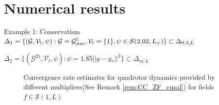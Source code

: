 \documentclass{beamer}
\begin{document}
\section{Numerical results}
\begin{frame}{Example 1: Conservatism}
$\Delta_1 = \{(\mathcal{G},\mathcal{V}_l,\psi):\mathcal{G}=\mathcal{G}_{\textnormal{star}}^5,\mathcal{V}_l=\{1\} , \psi \in \mathcal{S}(2.02,L_{\psi})\} \subset \Delta_{0.3,L}$

$\Delta_2 = \{(\mathcal{G}^{25},\mathcal{V}_l,\psi):\psi = 1.85 ||y-y_*||^2 \} \subset \Delta_{m,L}$
\begin{figure}[t]
	
	\caption{Convergence rate estimates for quadrotor dynamics provided by different multipliers(See Remark \ref{rem:CC_ZF_cusal}) for fields $f\in \mathcal{S}(1,L)$}
	\centering
\end{figure}
\end{frame}
\end{document}
